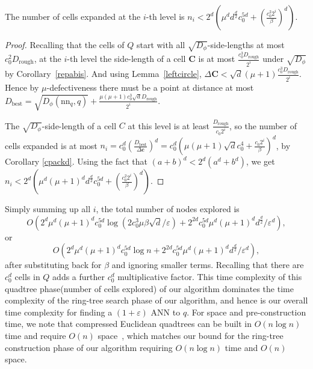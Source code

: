 \documentclass[11pt]{myclass}
\newcommand{\breg}{\ensuremath{D_\phi}}
\newcommand{\eps}{\varepsilon}
\begin{document}
\begin{lemma}\label{atreebreadth}
 The number of cells expanded at the $i$-th level is 
$n_i < 2^d(\mu^d d^{\frac{d}{2}} c_0^{5d} + (\frac{c_0^2 2^i}{\beta})^d)$.
\end{lemma}
 
\begin{proof}
Recalling that the cells of $Q$ start with all $\sqrt{\breg}$-side-lengths at most $c_0^2 D_{\text{rough}}$,
at the $i$-th level the side-length of a cell $\textbf{C}$ is at most $\frac{c_0^3  
D_{\text{rough}}}{2^i}$ under $\sqrt{\breg}$ by Corollary~\ref{repabis}. 
And using Lemma~\ref{leftcircle},  $\Delta{\textbf{C}} < \sqrt{d}(\mu+1) \frac{c_0^3  D_{\text{rough}}}{2^i}$.
Hence by $\mu$-defectiveness there must be a point at distance at most 
$D_{\text{best}} = \sqrt{\breg(\text{nn}_q,q)} + \frac{\mu (\mu+1) c_0^3 \sqrt{d} D_{\text{rough}}}{2^i}$.

The $\sqrt{\breg}$-side-length of a cell $C$ at this level is at least $\frac{D_{\text{rough}}}{c_0 2^i}$, so the number of cells expanded is at most $n_i = c_0^d(\frac{D_{\text{best}}}{\Delta{\textbf{c}}})^d = 
c_0^d( \mu (\mu+1) \sqrt{d} c_0^4   + \frac{c_0 2^i}{\beta})^d$, 
by Corollary \ref{cpackd}.
Using the fact that $(a+b)^d < 2^d (a^d + b^d)$, we get 
$n_i < 2^d \left(\mu^d (\mu+1)^d d^{\frac{d}{2}} c_0^{5d} + (\frac{c_0^2 2^i}{\beta})^d \right)$.
\end{proof}

Simply summing up all $i$, the total number of nodes explored is
\[
O(2^d \mu^d (\mu+1)^d c_0^{5d} \log(2 c_0^3 \mu \beta \sqrt{d} /\eps) + 2^{2d} c_0^{5d} \mu^d
(\mu+1)^d d^{\frac{d}{2}}/\eps^d),
\]
or
\[
O \left(2^d \mu^d (\mu+1)^d c_0^{5d} \log n + 2^{2d} c_0^{5d} \mu^d
(\mu+1)^d d^{\frac{d}{2}}/\eps^d \right),
\]
after substituting back for $\beta$ and ignoring smaller terms.
Recalling that there are $c_0^d$ cells in $Q$ adds a further $c_0^d$ multiplicative factor.
This time complexity of this quadtree phase(number of cells explored) of our algorithm dominates the time complexity of the ring-tree 
search phase of our algorithm, and hence is our overall time
complexity for finding a $(1+ \eps)$ ANN to $q$.
For space and pre-construction time, we note that compressed Euclidean quadtrees can be built in $O(n \log n)$ time and require $O(n)$ space~\cite{snotes},
which matches our bound for the ring-tree construction phase of our algorithm requiring $O(n \log n)$ time and $O(n)$ space. 
\end{document}
